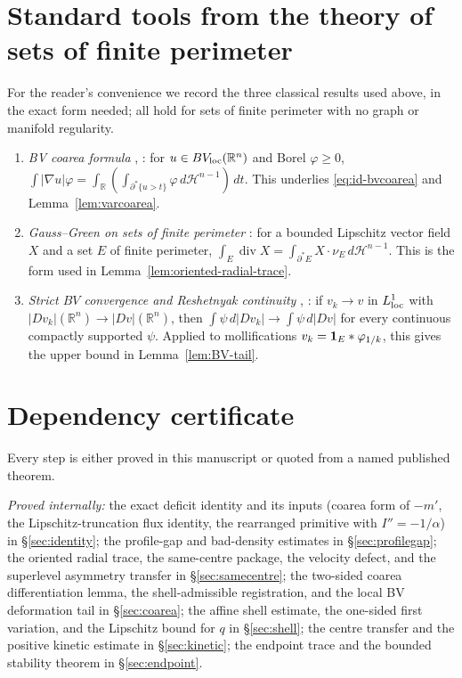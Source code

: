 \documentclass[11pt]{amsart}
\theoremstyle{definition}
\newcommand{\R}{\mathbb R}
\newcommand{\Hn}{\mathcal H^{n-1}}
\begin{document}
\appendix

\section{Standard tools from the theory of sets of finite perimeter}
\label{app:bv}

For the reader's convenience we record the three classical results used above,
in the exact form needed; all hold for sets of finite perimeter with no graph
or manifold regularity.

\begin{enumerate}[leftmargin=2em]
\item \emph{BV coarea formula} \cite[Thm.~13.1]{Maggi2012},
\cite[Thm.~3.40]{AFP2000}: for \(u\in BV_{\rm loc}(\R^n)\) and Borel
\(\varphi\ge0\),
\(\int|\nabla u|\varphi=\int_{\R}(\int_{\partial^*\{u>t\}}\varphi\,d\Hn)\,dt\).
This underlies \eqref{eq:id-bvcoarea} and Lemma~\ref{lem:varcoarea}.
\item \emph{Gauss--Green on sets of finite perimeter}
\cite[Ch.~17]{Maggi2012}: for a bounded Lipschitz vector field \(X\) and a set
\(E\) of finite perimeter,
\(\int_E\operatorname{div}X=\int_{\partial^*E}X\cdot\nu_E\,d\Hn\).  This is the
form used in Lemma~\ref{lem:oriented-radial-trace}.
\item \emph{Strict \(BV\) convergence and Reshetnyak continuity}
\cite[Thm.~2.39]{AFP2000}, \cite[Ch.~20]{Maggi2012}: if
\(v_k\to v\) in \(L^1_{\rm loc}\) with \(|Dv_k|(\R^n)\to|Dv|(\R^n)\), then
\(\int\psi\,d|Dv_k|\to\int\psi\,d|Dv|\) for every continuous compactly
supported \(\psi\).  Applied to mollifications \(v_k={\bf1}_E*\varphi_{1/k}\),
this gives the upper bound in Lemma~\ref{lem:BV-tail}.
\end{enumerate}

\section{Dependency certificate}\label{app:constants}

Every step is either proved in this manuscript or quoted from a named
published theorem.

\emph{Proved internally:} the exact deficit identity and its inputs (coarea
form of \(-m'\), the Lipschitz-truncation flux identity, the rearranged
primitive with \(I''=-1/\alpha\)) in \S\ref{sec:identity}; the profile-gap and
bad-density estimates in \S\ref{sec:profilegap}; the
oriented radial trace, the same-centre package, the velocity defect, and the
superlevel asymmetry transfer in \S\ref{sec:samecentre}; the two-sided coarea
differentiation lemma, the shell-admissible registration, and the local BV
deformation tail in \S\ref{sec:coarea}; the affine shell estimate, the
one-sided first variation, and the Lipschitz bound for \(q\) in
\S\ref{sec:shell}; the centre transfer and the positive kinetic estimate in
\S\ref{sec:kinetic}; the endpoint trace and the bounded stability theorem in
\S\ref{sec:endpoint}.
\end{document}
